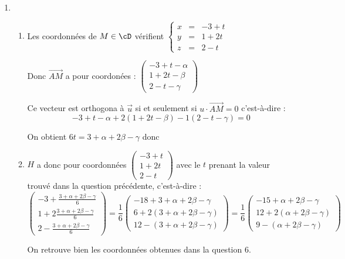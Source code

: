 \documentclass[a4paper, 11pt,reqno]{article}
\begin{document}
\begin{correction}
\begin{enumerate}
\item \begin{enumerate}
\item  Les coordonnées de $M\in \cD$ vérifient $ \left\{ 
\begin{array}{ccc}
x&=& -3+t\\
y&=& 1+2t\\
z&=& 2-t
\end{array}\right.$

Donc $\vec{AM} $ a pour coordonées : $\begin{pmatrix}
-3+t-\alpha\\
1+2t-\beta\\
2-t-\gamma
\end{pmatrix}$

Ce vecteur est orthogona à $\vec{u}$ si et seulement si $u\cdot \vec{AM} =0$ c'est-à-dire :
$$-3+t-\alpha + 2(1+2t-\beta) -1 (2-t-\gamma) =0$$

On obtient  $6t = 3+\alpha +2\beta-\gamma $ donc 


\item $H$ a donc pour coordonnées 
$\begin{pmatrix}
-3+t\\
1+2t\\
2-t
\end{pmatrix}$
avec le $t$ prenant la valeur trouvé dans la question précédente, c'est-à-dire : 
$$\begin{pmatrix}
-3+\frac{ 3+\alpha +2\beta-\gamma}{6}\\
1+2\frac{ 3+\alpha +2\beta-\gamma}{6}\\
2-\frac{ 3+\alpha +2\beta-\gamma}{6}
\end{pmatrix} 
=
\frac{1}{6}\begin{pmatrix}
-18+3+\alpha +2\beta-\gamma\\
6+2(3+\alpha +2\beta-\gamma)\\
12-(3+\alpha +2\beta-\gamma)
\end{pmatrix} 
=
\frac{1}{6}\begin{pmatrix}
-15+\alpha +2\beta-\gamma\\
12+2(\alpha +2\beta-\gamma)\\
9-(\alpha +2\beta-\gamma)
\end{pmatrix} 
$$

On retrouve bien les coordonnées obtenues dans la question $6$. 

\end{enumerate}


\end{enumerate}
\end{correction}
\end{document}
